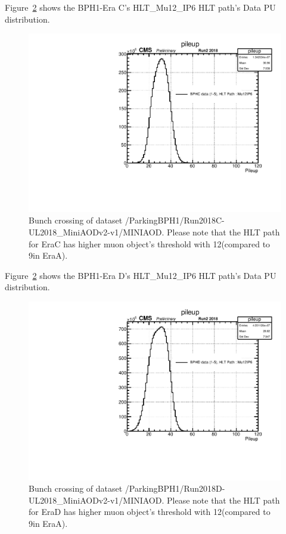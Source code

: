 Figure~\ref{fig:EraCData} shows the BPH1-Era C's HLT\_Mu12\_IP6 HLT path's Data PU distribution.
\begin{figure}[h!]
\caption{Bunch crossing of dataset /ParkingBPH1/Run2018C-UL2018\_MiniAODv2-v1/MINIAOD. Please note that the HLT path for EraC has higher muon object's \pt threshold with 12\GeV (compared to 9\GeV in EraA).}
  \label{fig:EraCData}
  \centering
  \includegraphics[width=0.57\linewidth]{figs/NVtx_BPHC.pdf}

\end{figure}

Figure~\ref{fig:EraCData} shows the BPH1-Era D's HLT\_Mu12\_IP6 HLT path's Data PU distribution.
\begin{figure}[h!]
\caption{Bunch crossing of dataset /ParkingBPH1/Run2018D-UL2018\_MiniAODv2-v1/MINIAOD. Please note that the HLT path for EraD has higher muon object's \pt threshold with 12\GeV (compared to 9\GeV in EraA).}
  \label{fig:EraCData}
  \centering
  \includegraphics[width=0.57\linewidth]{figs/NVtx_BPHD.pdf}

\end{figure}

